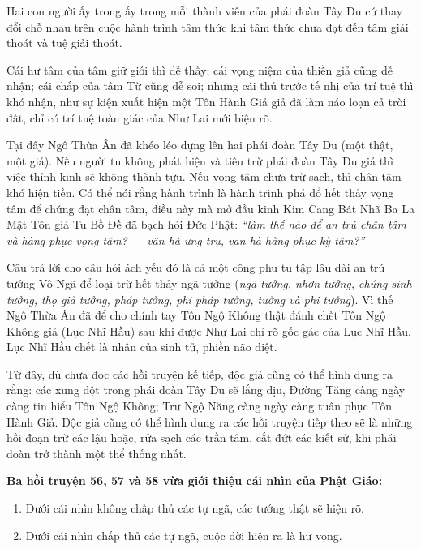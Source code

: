 Hai con người ấy trong ấy trong mỗi thành viên của phái đoàn Tây Du cứ thay đổi chỗ nhau trên cuộc hành trình tâm thức khi tâm thức chưa đạt đến tâm giải thoát và tuệ giải thoát.

Cái hư tâm của tâm giữ giới thì dễ thấy; cái vọng niệm của thiền giả cũng dễ nhận; cái chấp của tâm Từ cũng dễ soi; nhưng cái thủ trước tế nhị của trí tuệ thì khó nhận, như sự kiện xuất hiện một Tôn Hành Giả giả đã làm náo loạn cả trời đất, chỉ có trí tuệ toàn giác của Như Lai mới biện rõ.

Tại đây Ngô Thừa Ân đã khéo léo dựng lên hai phái đoàn Tây Du (một thật, một giả). Nếu người tu không phát hiện và tiêu trừ phái đoàn Tây Du giả thì việc thỉnh kinh sẽ không thành tựu. Nếu vọng tâm chưa trừ sạch, thì chân tâm khó hiện tiền. Có thể nói rằng hành trình là hành trình phá đổ hết thảy vọng tâm để chứng đạt chân tâm, điều này mà mở đầu kinh Kim Cang Bát Nhã Ba La Mật Tôn giả Tu Bồ Đề đã bạch hỏi Đức Phật: \emph{``làm thế nào để an trú chân tâm và hàng phục vọng tâm? --- vân hà ưng trụ, van hà hàng phục kỳ tâm?''}

Câu trả lời cho câu hỏi ách yếu đó là cả một công phu tu tập lâu dài an trú tưởng Vô Ngã để loại trừ hết thảy ngã tưởng (\emph{ngã tưởng, nhơn tưởng, chúng sinh tưởng, thọ giả tưởng, pháp tưởng, phi pháp tưởng, tưởng và phi tưởng}). Vì thế Ngô Thừa Ân đã để cho chính tay Tôn Ngộ Không thật đánh chết Tôn Ngộ Không giả (Lục Nhĩ Hầu) sau khi được Như Lai chỉ rõ gốc gác của Lục Nhĩ Hầu. Lục Nhĩ Hầu chết là nhân của sinh tử, phiền não diệt.

Từ đây, dù chưa đọc các hồi truyện kế tiếp, độc giả cũng có thể hình dung ra rằng: các xung đột trong phái đoàn Tây Du sẽ lắng dịu, Đường Tăng càng ngày càng tin hiểu Tôn Ngộ Không; Trư Ngộ Năng càng ngày càng tuân phục Tôn Hành Giả. Độc giả cũng có thể hình dung ra các hồi truyện tiếp theo sẽ là những hồi đoạn trừ các lậu hoặc, rửa sạch các trần tâm, cắt đứt các kiết sử, khi phái đoàn trở thành một thể thống nhất.

{\bf Ba hồi truyện 56, 57 và 58 vừa giới thiệu cái nhìn của Phật Giáo:}

\begin{enumerate}[label=\itshape\alph*\upshape/]
    \item Dưới cái nhìn không chấp thủ các tự ngã, các tướng thật sẽ hiện rõ.

    \item Dưới cái nhìn chấp thủ các tự ngã, cuộc đời hiện ra là hư vọng.
\end{enumerate}

